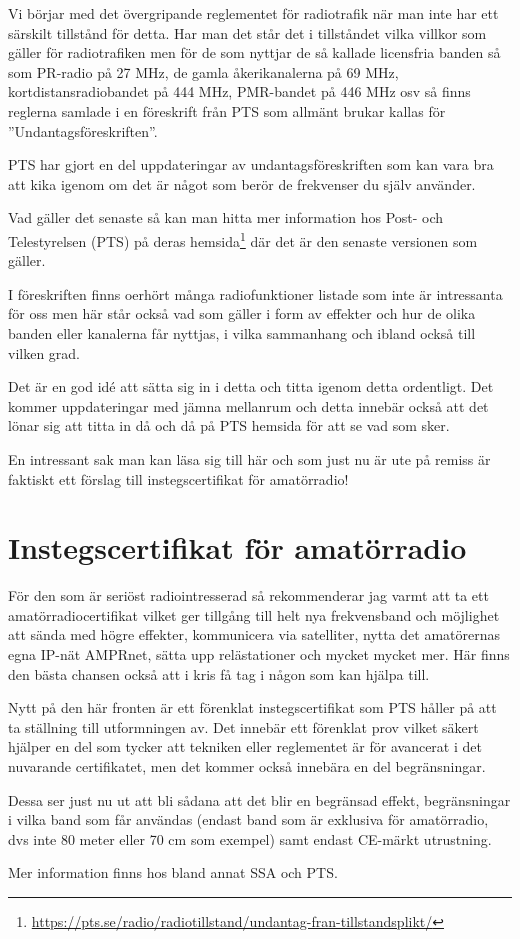 Vi börjar med det övergripande reglementet för radiotrafik när man inte har ett särskilt tillstånd för detta. Har man det står det i tillståndet vilka villkor som gäller för radiotrafiken men för de som nyttjar de så kallade licensfria banden så som PR-radio på 27 MHz, de gamla åkerikanalerna på 69 MHz, kortdistansradiobandet på 444 MHz, PMR-bandet på 446 MHz osv så finns reglerna samlade i en föreskrift från PTS som allmänt brukar kallas för ''Undantagsföreskriften''.

PTS har gjort en del uppdateringar av undantagsföreskriften som kan vara bra att kika igenom om det är något som berör de frekvenser du själv använder.

Vad gäller det senaste så kan man hitta mer information hos Post- och Telestyrelsen (PTS) på deras hemsida\footnote{\href{https://pts.se/radio/radiotillstand/undantag-fran-tillstandsplikt/}{https://pts.se/radio/radiotillstand/undantag-fran-tillstandsplikt/}} där det är den senaste versionen som gäller.

I föreskriften finns oerhört många radiofunktioner listade som inte är intressanta för oss men här står också vad som gäller i form av effekter och hur de olika banden eller kanalerna får nyttjas, i vilka sammanhang och ibland också till vilken grad. 

Det är en god idé att sätta sig in i detta och titta igenom detta ordentligt. Det kommer uppdateringar med jämna mellanrum och detta innebär också att det lönar sig att titta in då och då på PTS hemsida för att se vad som sker.

En intressant sak man kan läsa sig till här och som just nu är ute på remiss är faktiskt ett förslag till instegscertifikat för amatörradio!

\section*{Instegscertifikat för amatörradio}

För den som är seriöst radiointresserad så rekommenderar jag varmt att ta ett amatörradiocertifikat vilket ger tillgång till helt nya frekvensband och möjlighet att sända med högre effekter, kommunicera via satelliter, nytta det amatörernas egna IP-nät AMPRnet, sätta upp relästationer och mycket mycket mer. Här finns den bästa chansen också att i kris få tag i någon som kan hjälpa till. 

Nytt på den här fronten är ett förenklat instegscertifikat som PTS håller på att ta ställning till utformningen av. Det innebär ett förenklat prov vilket säkert hjälper en del som tycker att tekniken eller reglementet är för avancerat i det nuvarande certifikatet, men det kommer också innebära en del begränsningar. 

Dessa ser just nu ut att bli sådana att det blir en begränsad effekt, begränsningar i vilka band som får användas (endast band som är exklusiva för amatörradio, dvs inte 80 meter eller 70 cm som exempel) samt endast CE-märkt utrustning.

Mer information finns hos bland annat SSA och PTS.

\clearpage
	

